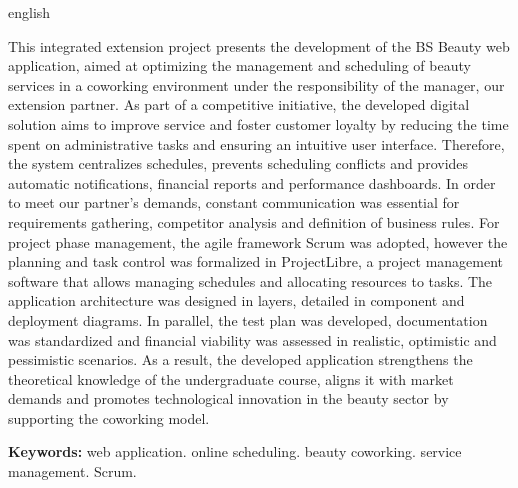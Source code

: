 	\begin{resumo}[ABSTRACT]
	\begin{otherlanguage*}{english}
		
		This integrated extension project presents the development of the BS Beauty web application, aimed at optimizing the management and scheduling of beauty services in a coworking environment under the responsibility of the manager, our extension partner. As part of a competitive initiative, the developed digital solution aims to improve service and foster customer loyalty by reducing the time spent on administrative tasks and ensuring an intuitive user interface. Therefore, the system centralizes schedules, prevents scheduling conflicts and provides automatic notifications, financial reports and performance dashboards. In order to meet our partner’s demands, constant communication was essential for requirements gathering, competitor analysis and definition of business rules. For project phase management, the agile framework Scrum was adopted, however the planning and task control was formalized in ProjectLibre, a project management software that allows managing schedules and allocating resources to tasks. The application architecture was designed in layers, detailed in component and deployment diagrams. In parallel, the test plan was developed, documentation was standardized and financial viability was assessed in realistic, optimistic and pessimistic scenarios. As a result, the developed application strengthens the theoretical knowledge of the undergraduate course, aligns it with market demands and promotes technological innovation in the beauty sector by supporting the coworking model.
		
		\textbf{Keywords:} web application. online scheduling. beauty coworking. service management. Scrum.
		
	\end{otherlanguage*}
\end{resumo}